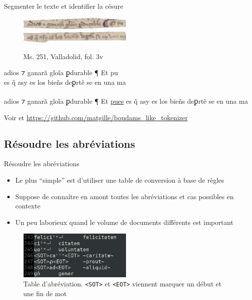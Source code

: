 \documentclass[11pt,aspectratio=169]{beamer}
\let\cite\parencite
\begin{document}
\begin{frame}{Segmenter le texte et identifier la césure}
\color{black}
\begin{figure}[htp!]
\begin{center}
\includegraphics[width=0.5\textwidth]{img/ligne_1.png}
\includegraphics[width=0.5\textwidth]{img/ligne_2.png}
\caption{Ms. 251, Valladolid, fol. 3v}
\end{center}
\end{figure}
\begin{center}
\pause adios ⁊ ganarã gloĩa ꝑdurable ¶ Et pu\\
es q̃ asy es los bieñs deꝑrtẽ se en una ma\\
\pause{\color{black}$\Updownarrow$}\\
\pause adios ⁊ ganarã gloĩa ꝑdurable ¶ Et \underline{pues} es q̃ asy es los bieñs deꝑrtẽ se en una ma
\end{center}
\pause Voir \cite{clerice_EvaluatingDeepLearning_2020} et \url{https://github.com/matgille/boudams_like_tokenizer}
\end{frame}

\subsection{Résoudre les abréviations}
\begin{frame}{Résoudre les abréviations}
\begin{center}
\begin{itemize}
\item Le plus \enquote{simple} est d'utiliser une table de conversion à base de règles
\item Suppose de connaître en amont toutes les abréviations et cas possibles en contexte
\item Un peu laborieux quand le volume de documents différents est important
\end{itemize}
\begin{figure}
\includegraphics[width=0.5\textwidth]{img/table_abreviation.png}
\caption{Table d'abréviation. \texttt{<SOT>} et \texttt{<EOT>} viennent marquer un début et une fin de mot}
\end{figure}
\end{center}
\end{frame}
\end{document}
